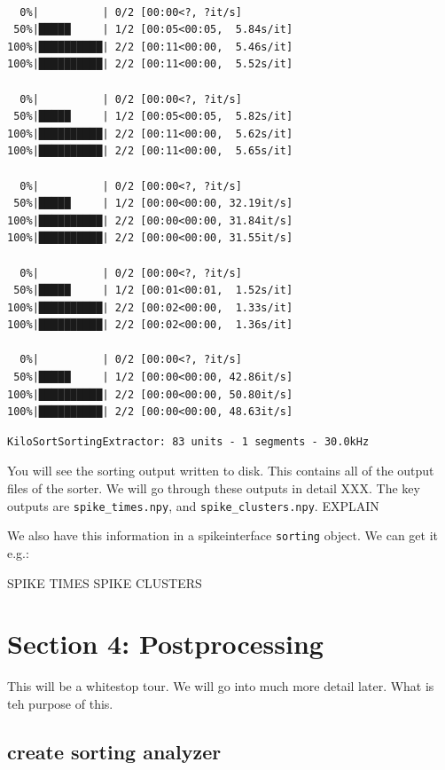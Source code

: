 \documentclass[
  letterpaper,
  DIV=11,
  numbers=noendperiod]{scrreprt}
\begin{document}
\begin{verbatim}

  0%|          | 0/2 [00:00<?, ?it/s]
 50%|█████     | 1/2 [00:05<00:05,  5.84s/it]
100%|██████████| 2/2 [00:11<00:00,  5.46s/it]
100%|██████████| 2/2 [00:11<00:00,  5.52s/it]

  0%|          | 0/2 [00:00<?, ?it/s]
 50%|█████     | 1/2 [00:05<00:05,  5.82s/it]
100%|██████████| 2/2 [00:11<00:00,  5.62s/it]
100%|██████████| 2/2 [00:11<00:00,  5.65s/it]

  0%|          | 0/2 [00:00<?, ?it/s]
 50%|█████     | 1/2 [00:00<00:00, 32.19it/s]
100%|██████████| 2/2 [00:00<00:00, 31.84it/s]
100%|██████████| 2/2 [00:00<00:00, 31.55it/s]

  0%|          | 0/2 [00:00<?, ?it/s]
 50%|█████     | 1/2 [00:01<00:01,  1.52s/it]
100%|██████████| 2/2 [00:02<00:00,  1.33s/it]
100%|██████████| 2/2 [00:02<00:00,  1.36s/it]

  0%|          | 0/2 [00:00<?, ?it/s]
 50%|█████     | 1/2 [00:00<00:00, 42.86it/s]
100%|██████████| 2/2 [00:00<00:00, 50.80it/s]
100%|██████████| 2/2 [00:00<00:00, 48.63it/s]
\end{verbatim}

\begin{verbatim}
KiloSortSortingExtractor: 83 units - 1 segments - 30.0kHz
\end{verbatim}

You will see the sorting output written to disk. This contains all of
the output files of the sorter. We will go through these outputs in
detail XXX. The key outputs are \texttt{spike\_times.npy}, and
\texttt{spike\_clusters.npy}. EXPLAIN

We also have this information in a spikeinterface \texttt{sorting}
object. We can get it e.g.:

SPIKE TIMES SPIKE CLUSTERS

\section*{Section 4: Postprocessing}\label{section-4-postprocessing}


This will be a whitestop tour. We will go into much more detail later.
What is teh purpose of this.

\subsection*{create sorting analyzer}\label{create-sorting-analyzer}
\end{document}

